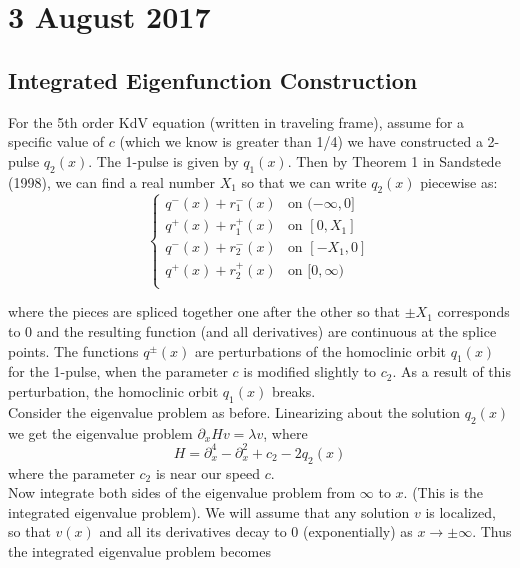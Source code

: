 \documentclass[12pt]{article}
\begin{document}
\section*{3 August 2017}

\subsection*{Integrated Eigenfunction Construction}
For the 5th order KdV equation (written in traveling frame), assume for a specific value of $c$ (which we know is greater than 1/4) we have constructed a 2-pulse $q_2(x)$. The 1-pulse is given by $q_1(x)$. Then by Theorem 1 in Sandstede (1998), we can find a real number $X_1$ so that we can write $q_2(x)$ piecewise as:
\begin{equation}\label{q2piecewise}
\begin{cases}
q^-(x) + r_1^-(x) & \text{on } (-\infty, 0] \\
q^+(x) + r_1^+(x) & \text{on } [0, X_1] \\
q^-(x) + r_2^-(x) & \text{on } [-X_1, 0] \\
q^+(x) + r_2^+(x) & \text{on } [0, \infty) \\ 
\end{cases}
\end{equation}

where the pieces are spliced together one after the other so that $\pm X_1$ corresponds to 0 and the resulting function (and all derivatives) are continuous at the splice points. The functions $q^\pm(x)$ are perturbations of the homoclinic orbit $q_1(x)$ for the 1-pulse, when the parameter $c$ is modified slightly to $c_2$. As a result of this perturbation, the homoclinic orbit $q_1(x)$ breaks. \\

Consider the eigenvalue problem as before. Linearizing about the solution $q_2(x)$ we get the eigenvalue problem $\partial_x H v = \lambda v$, where 
\begin{equation}\label{hamiltonian}
H = \partial_x^4 - \partial_x^2 + c_2 - 2 q_2(x)
\end{equation}
where the parameter $c_2$ is near our speed $c$. \\

Now integrate both sides of the eigenvalue problem from $\infty$ to $x$. (This is the integrated eigenvalue problem). We will assume that any solution $v$ is localized, so that $v(x)$ and all its derivatives decay to 0 (exponentially) as $x \rightarrow \pm \infty$. Thus the integrated eigenvalue problem becomes
\end{document}
